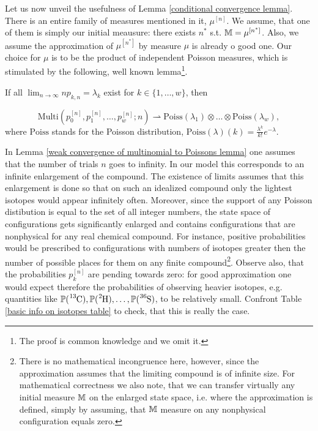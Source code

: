 Let us now unveil the usefulness of Lemma \ref{conditional convergence lemma}. There is an entire family of measures mentioned in it, $\mu^{[n]}$. We assume, that one of them is simply our initial meausure: there exists $n^*$ s.t. $\mathbb{M} = \mu^{[n^*]}$. Also, we assume the approximation of $\mu^{[n^*]}$ by measure $\mu$ is already o good one. Our choice for $\mu$ is to be the product of independent Poisson measures, which is stimulated by the following, well known lemma\footnote{ The proof is common knowledge and we omit it.}.


\begin{lemma}\label{weak convergence of multinomial to Poissons lemma}
	If all\,\,$\lim_{n\to \infty} n p_{k,n}= \lambda_k$ exist for $k \in \{1,\dots, w\}$, then 
	
	\begin{equation}\label{weak convergence of multionial to Poissons equation}
		\mathrm{Multi}\left( p_0^{[n]}, p_1^{[n]}, \dots, p_w^{[n]}; n \right) 
			\rightharpoonup 
		\mathrm{Poiss}( \lambda_1) \otimes \dots \otimes \mathrm{Poiss}( \lambda_w ),	
	\end{equation}
	where $\mathrm{Poiss}$ stands for the Poisson distribution, $\mathrm{Poiss}(\lambda)(k) 	= \frac{\lambda^k}{k!}e^{-\lambda}$.
	
\end{lemma}


In Lemma \ref{weak convergence of multinomial to Poissons lemma} one assumes that the number of trials $n$ goes to infinity. In our model this corresponds to an infinite enlargement of the compound. The existence of limits assumes that this enlargement is done so that on such an idealized compound only the lightest isotopes would appear infinitely often. Moreover, since the support of any Poisson distibution is equal to the set of all integer numbers, the state space of configurations gets significantly enlarged and contains configurations that are nonphysical for any real chemical compound. For instance, positive probabilities would be prescribed to configurations with numbers of isotopes greater then the number of possible places for them on any finite compound\footnote{There is no mathematical incongruence here, however, since the approximation assumes that the limiting compound is of infinite size. For mathematical correctness we also note, that we can transfer virtually any initial measure $\mathbb{M}$ on the enlarged state space, i.e. where the approximation is defined, simply by assuming, that $\mathbb{M}$ measure on any nonphysical configuration equals zero.}. Observe also, that the probabilities $p_k^{[n]}$ are pending towards zero: for good approximation one would expect therefore the probabilities of observing heavier isotopes, e.g. quantities like $\prob(\cem{^{13}C}), \prob(\cem{^{2}H}), \dots, \prob(\cem{^{36}S})$, to be relatively small. Confront Table \ref{basic info on isotopes table} to check, that this is really the case.


